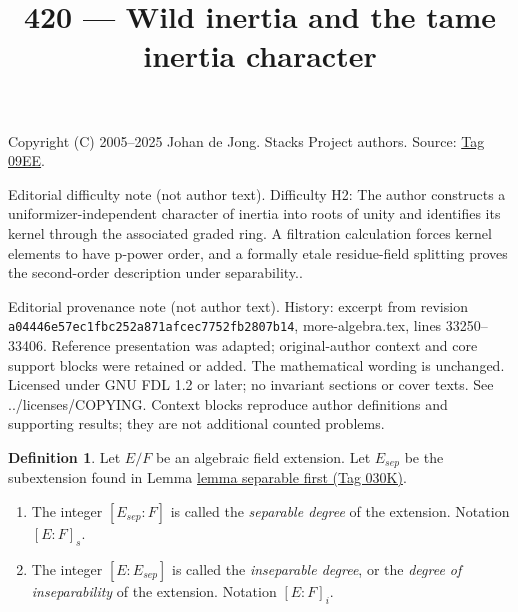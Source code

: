 \documentclass{amsart}
\theoremstyle{plain}
\theoremstyle{definition}
\newtheorem{definition}[subsection]{Definition}
\theoremstyle{remark}
\numberwithin{equation}{subsection}
\begin{document}
\title[Stacks Project, Tag 09EE]{420 --- Wild inertia and the tame inertia character}
\maketitle
\noindent Copyright (C) 2005--2025 Johan de Jong. Stacks Project authors. Source: \href{https://stacks.math.columbia.edu/tag/09EE}{Tag 09EE}.

\noindent Editorial difficulty note (not author text). Difficulty H2: The author constructs a uniformizer-independent character of inertia into roots of unity and identifies its kernel through the associated graded ring. A filtration calculation forces kernel elements to have p-power order, and a formally etale residue-field splitting proves the second-order description under separability..

\noindent Editorial provenance note (not author text). History: excerpt from revision \texttt{a0444\allowbreak 6e57e\allowbreak c1fbc\allowbreak 252a8\allowbreak 71afc\allowbreak ec775\allowbreak 2fb28\allowbreak 07b14}, more-algebra.tex, lines 33250--33406. Reference presentation was adapted; original-author context and core support blocks were retained or added. The mathematical wording is unchanged. Licensed under GNU FDL 1.2 or later; no invariant sections or cover texts. See ../licenses/COPYING. Context blocks reproduce author definitions and supporting results; they are not additional counted problems.

\begin{definition}
\label{fields-definition-insep-degree}
Let $E/F$ be an algebraic field extension. Let $E_{sep}$ be the subextension
found in Lemma \href{https://stacks.math.columbia.edu/tag/030K}{lemma separable first (Tag 030K)}.
\begin{enumerate}
\item The integer $[E_{sep} : F]$ is called the {\it separable
degree} of the extension. Notation $[E : F]_s$.
\item The integer $[E : E_{sep}]$ is called the {\it inseparable
degree}, or the {\it degree of inseparability} of the extension.
Notation $[E : F]_i$.
\end{enumerate}
\end{definition}
\end{document}
